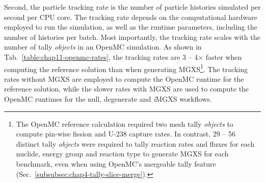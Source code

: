 Second, the particle tracking rate is the number of particle histories simulated per second per CPU core. The tracking rate depends on the computational hardware employed to run the simulation, as well as the runtime parameters, including the number of histories per batch. Most importantly, the tracking rate scales with the number of tally \textit{objects} in an OpenMC simulation. As shown in Tab.~\ref{table:chap11-openmc-rates}, the tracking rates are 3 -- 4$\times$ faster when computing the reference solution than when generating \ac{MGXS}\footnote{The OpenMC reference calculation required two mesh tally \textit{objects} to compute pin-wise fission and U-238 capture rates. In contrast, 29 -- 56 distinct tally \textit{objects} were required to tally reaction rates and fluxes for each nuclide, energy group and reaction type to generate \ac{MGXS} for each benchmark, even when using OpenMC's mergeable tally feature (Sec.~\ref{subsubsec:chap4-tally-slice-merge}).}. The tracking rates without \ac{MGXS} are employed to compute the OpenMC runtime for the reference solution, while the slower rates with \ac{MGXS} are used to compute the OpenMC runtimes for the null, degenerate and \textit{i}\ac{MGXS} workflows.


\vspace{6pt}

